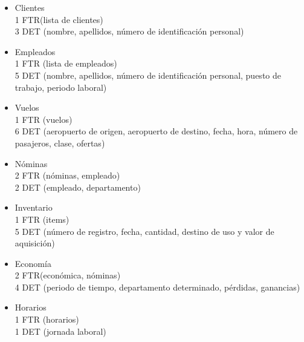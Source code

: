 \begin{enumerate}
		\begin{itemize}
			\item Clientes \\
			{1 FTR(lista de clientes)}\\
			{3 DET (nombre, apellidos, número de identificación personal)}\\					
			\item Empleados \\
			{1 FTR (lista de empleados)}\\
			{5 DET (nombre, apellidos, número de identificación personal, puesto de trabajo, periodo laboral)}\\
			\item Vuelos \\
			{1 FTR (vuelos)}\\
			{6 DET (aeropuerto de origen, aeropuerto de destino, fecha, hora, número de pasajeros, clase, ofertas)}\\										
			\item Nóminas \\
			{2 FTR (nóminas, empleado)}\\
			{2 DET (empleado, departamento)}\\
			\item Inventario \\
			{1 FTR (items)}\\
			{5 DET (número de registro, fecha, cantidad, destino de uso y valor de aquisición)}\\
			\item Economía \\
			{2 FTR(económica, nóminas)}\\
			{4 DET (periodo de tiempo, departamento determinado, pérdidas, ganancias)}\\
			\item Horarios \\
			{1 FTR (horarios)}\\
			{1 DET (jornada laboral)}\\					
		\end{itemize}
	
\end{enumerate}
